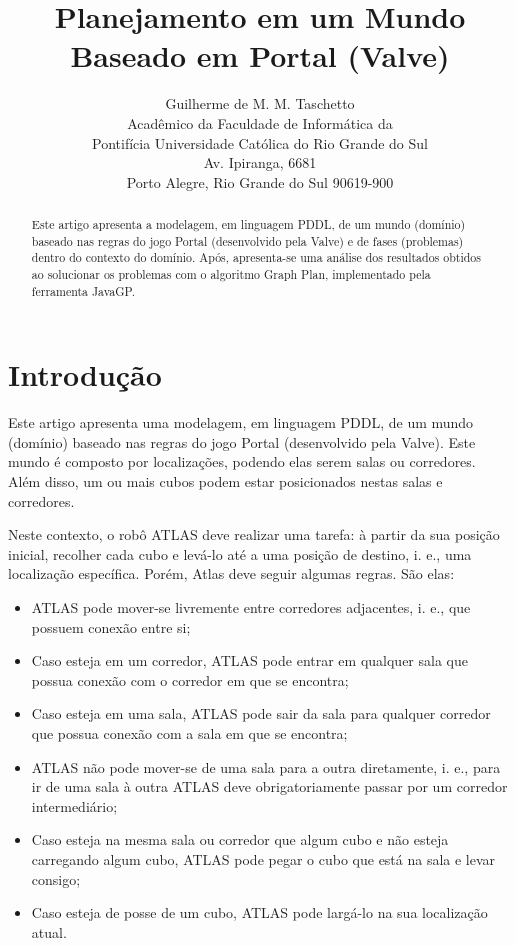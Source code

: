 \documentclass[letterpaper]{article}
\begin{document}
\title{Planejamento em um Mundo\\Baseado em Portal (Valve)}
\author{Guilherme de M. M. Taschetto\\
Acadêmico da Faculdade de Informática da\\
Pontifícia Universidade Católica do Rio Grande do Sul\\
Av. Ipiranga, 6681\\
Porto Alegre, Rio Grande do Sul 90619-900}

\maketitle
\begin{abstract}
Este artigo apresenta a modelagem, em linguagem PDDL, de um mundo (domínio) baseado nas regras do jogo Portal
(desenvolvido pela Valve) e de fases (problemas) dentro do contexto do domínio. Após, apresenta-se uma análise dos
resultados obtidos ao solucionar os problemas com o algoritmo Graph Plan, implementado pela ferramenta JavaGP.
\end{abstract}

\section{Introdução}

Este artigo apresenta uma modelagem, em linguagem PDDL, de um mundo (domínio) baseado nas regras do jogo Portal
(desenvolvido pela Valve). Este mundo é composto por localizações, podendo elas serem salas ou corredores. Além disso,
um ou mais cubos podem estar posicionados nestas salas e corredores.

Neste contexto, o robô ATLAS deve realizar uma tarefa: à partir da sua posição inicial, recolher cada cubo e levá-lo
até a uma posição de destino, i. e., uma localização específica. Porém, Atlas deve seguir algumas regras. São elas:

\begin{itemize}
\item ATLAS pode mover-se livremente entre corredores adjacentes, i. e., que possuem conexão entre si;
\item Caso esteja em um corredor, ATLAS pode entrar em qualquer sala que possua conexão com o corredor em que se encontra;
\item Caso esteja em uma sala, ATLAS pode sair da sala para qualquer corredor que possua conexão com a sala em que se encontra;
\item ATLAS não pode mover-se de uma sala para a outra diretamente, i. e., para ir de uma sala à outra ATLAS deve obrigatoriamente passar por um corredor intermediário;
\item Caso esteja na mesma sala ou corredor que algum cubo e não esteja carregando algum cubo, ATLAS pode pegar o cubo que está na sala e levar consigo;
\item Caso esteja de posse de um cubo, ATLAS pode largá-lo na sua localização atual.
\end{itemize}
\end{document}

